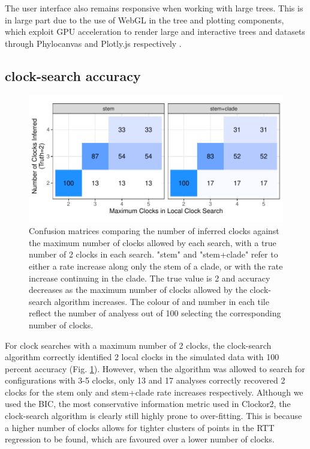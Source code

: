\documentclass{article}
\begin{document}
The user interface also remains responsive when working with large trees. This is in large part due to the use of WebGL in the tree and plotting components, which exploit GPU acceleration to render large and interactive trees and datasets through Phylocanvas and Plotly.js respectively \citep{abudahab_phylocanvasgl_2021,plotly}.

\subsection*{clock-search accuracy}
\begin{figure}[H]
\centering
\includegraphics[width = \linewidth]{inferredClocks.pdf}
\caption{Confusion matrices comparing the number of inferred clocks against the maximum number of clocks allowed by each search, with a true number of 2 clocks in each search. "stem" and "stem+clade" refer to either a rate increase along only the stem of a clade, or with the rate increase continuing in the clade. The true value is 2 and accuracy decreases as the maximum number of clocks allowed by the clock-search algorithm increases. The colour of and number in each tile reflect the number of analyess out of 100 selecting the corresponding number of clocks.}
\label{fig:simStudy}
\end{figure}

For clock searches with a maximum number of 2 clocks, the clock-search algorithm correctly identified 2 local clocks in the simulated data with 100 percent accuracy (Fig. \ref{fig:simStudy}). However, when the algorithm was allowed to search for configurations with 3-5 clocks, only 13 and 17 analyses correctly recovered 2 clocks for the stem only and stem+clade rate increases respectively. Although we used the BIC, the most conservative information metric used in Clockor2, the clock-search algorithm is clearly still highly prone to over-fitting. This is because a higher number of clocks allows for tighter clusters of points in the RTT regression to be found, which are favoured over a lower number of clocks.
\end{document}
